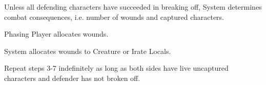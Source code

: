 \documentclass[12pt,letterpaper]{scrreprt}
\begin{document}
\begin{usecase}
{\begin{enumerate}
				\end{enumerate}
			\item Unless all defending characters have succeeded in breaking off, System determines combat consequences, i.e. number of wounds and captured characters.
			\item Phasing Player allocates wounds.
			\item System allocates wounds to Creature or Irate Locals.
			\item Repeat steps 3-7 indefinitely as long as both sides have live uncaptured characters and defender has not broken off.
		}
		\end{usecase}	
		
\end{document}
